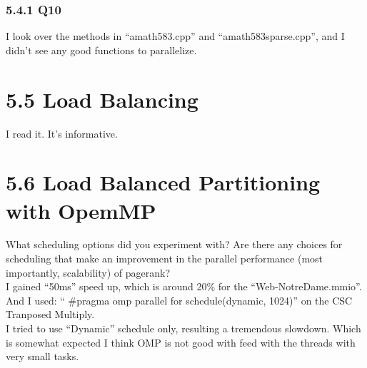 \documentclass[]{article}
\begin{document}
    \subsubsection*{5.4.1 Q10}
    I look over the methods in ``amath583.cpp'' and ``amath583sparse.cpp'', and I didn't see any good functions to parallelize. 

\section*{5.5 Load Balancing}
    I read it. It's informative. 

\section*{5.6 Load Balanced Partitioning with OpemMP}
    What scheduling options did you experiment with? Are there any choices for scheduling that make an improvement in the parallel performance (most importantly, scalability) of pagerank?
    \\[1.1em]
    I gained ``50ms'' speed up, which is around 20\% for the ``Web-NotreDame.mmio''. And I used: `` \#pragma omp parallel for schedule(dynamic, 1024)'' on the CSC Tranposed Multiply. 
    \\
    I tried to use ``Dynamic'' schedule only, resulting a tremendous slowdown. Which is somewhat expected I think OMP is not good with feed with the threads with very small tasks. 
\end{document}
